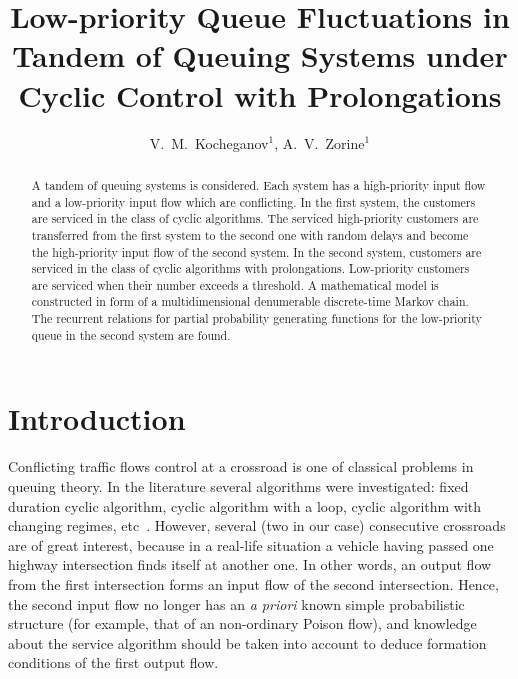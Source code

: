 \documentclass[10pt]{article}
\title{Low-priority Queue Fluctuations in Tandem of Queuing Systems under Cyclic Control with Prolongations}
\author{V.~M.~Kocheganov$^1$, A.~V.~Zorine$^1$}
\begin{document}
\maketitle

\begin{abstract}
A tandem of queuing systems is considered. Each system has a high-priority input flow and a low-priority input flow which are conflicting. In the first system, the customers are serviced in the class of cyclic algorithms. The serviced high-priority customers are transferred from the first system to the second one  with random delays and become the high-priority input flow of the second system. In the second system, customers are serviced in the class of cyclic algorithms with prolongations. Low-priority customers are serviced when their number exceeds a threshold. A mathematical model is constructed in form of a multidimensional denumerable discrete-time Markov chain. The recurrent relations for partial probability generating functions for the low-priority queue in the second system are found.

\end{abstract}


\section{Introduction}
Conflicting traffic flows control at a crossroad is one of classical problems in queuing theory. In
the literature several algorithms were investigated: fixed duration cyclic algorithm, cyclic
algorithm with a loop, cyclic algorithm with changing regimes,
etc~\cite{n:f:p:1968,f:1977,f:1977-1,l:f:2000,p:f:2008,a:b:2010}. However, several (two in our case)
consecutive crossroads are of great interest, because in a real-life situation a vehicle
having passed one highway intersection finds itself at another one. In other words, an output flow from
the first intersection forms an input flow of the second intersection. Hence, the second input flow
no longer has an \textit{a priori} known simple probabilistic structure (for example, that of an
non-ordinary Poison flow), and knowledge about the service algorithm should be taken into account
to deduce formation conditions of the first output flow.
\end{document}
